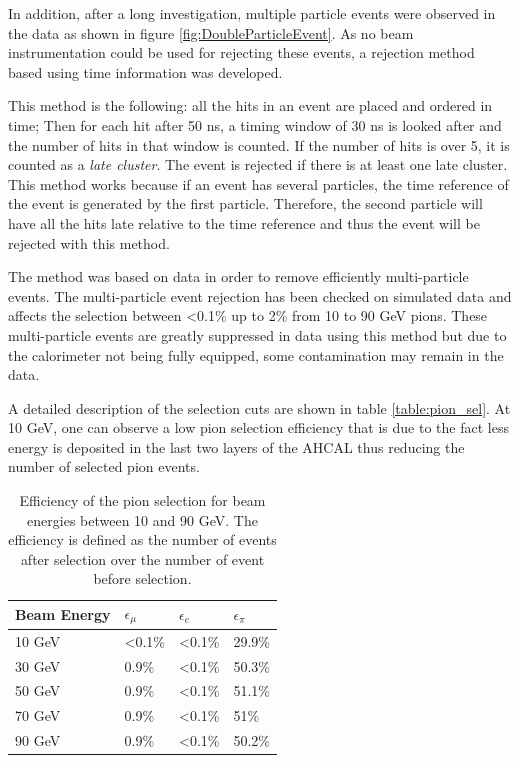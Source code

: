 In addition, after a long investigation, multiple particle events were observed in the data as shown in figure \ref{fig:DoubleParticleEvent}. As no beam instrumentation could be used for rejecting these events, a rejection method based using time information was developed.

This method is the following: all the hits in an event are placed and ordered in time; Then for each hit after 50 ns, a timing window of 30 ns is looked after and the number of hits in that window is counted. If the number of hits is over 5, it is counted as a \textit{late cluster}. The event is rejected if there is at least one late cluster. This method works because if an event has several particles, the time reference of the event is generated by the first particle. Therefore, the second particle will have all the hits late relative to the time reference and thus the event will be rejected with this method.

The method was based on data in order to remove efficiently multi-particle events. The multi-particle event rejection has been checked on simulated data and affects the selection between <0.1\% up to 2\% from 10 to 90 GeV pions. These multi-particle events are greatly suppressed in data using this method but due to the calorimeter not being fully equipped, some contamination may remain in the data.

A detailed description of the selection cuts are shown in table \ref{table:pion_sel}. At 10 GeV, one can observe a low pion selection efficiency that is due to the fact less energy is deposited in the last two layers of the AHCAL thus reducing the number of selected pion events.

\begin{table}[htb!]
	\centering
	\caption{Efficiency of the pion selection for beam energies between 10 and 90 GeV. The efficiency is defined as the number of events after selection over the number of event before selection.}
	\label{table:eff_pion}
	\begin{tabular}{@{} llll @{}}
		\toprule
		\textbf{Beam Energy} & \textbf{$\epsilon_{\mu}$} & \textbf{$\epsilon_{e}$} & \textbf{$\epsilon_{\pi}$}\\
		\midrule
		10 GeV & <0.1\% & <0.1\% & 29.9\%\\
		30 GeV & 0.9\% & <0.1\% & 50.3\%\\
		50 GeV & 0.9\% & <0.1\% & 51.1\%\\
		70 GeV & 0.9\% & <0.1\% & 51\%\\
		90 GeV & 0.9\% & <0.1\% & 50.2\%\\
		\bottomrule
	\end{tabular}
\end{table}

